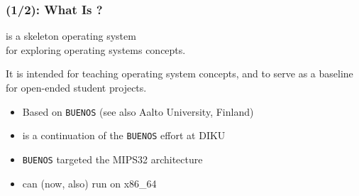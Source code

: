 \begin{frame}

\frametitle{\kudos{} (1/2): What Is \kudos{}?}

\vspace{\fill}

\begin{center}

\kudos{} is a skeleton operating system \\ for exploring operating systems
concepts.

\medskip

It is intended for teaching operating system concepts, and to serve as a
baseline for open-ended student projects.

\end{center}

\medskip

\begin{itemize}

\item Based on \texttt{BUENOS} (see also Aalto University, Finland)

\item \kudos{} is a continuation of the \texttt{BUENOS} effort at DIKU

\item \texttt{BUENOS} targeted the MIPS32 architecture

\item \kudos{} can (now, also) run on x86\_64

\end{itemize}

\vspace{\fill}

\end{frame}


